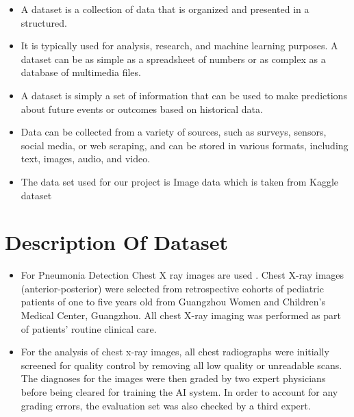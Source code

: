 
%
%
%



{ 
	

  \begin{itemize}
    \item A dataset is a collection of data that is organized and presented in a structured.
    
   \item It is typically used for analysis, research, and machine learning purposes. A dataset can be as simple as a spreadsheet of numbers or as complex as a database of multimedia files.
    
    \item A dataset is simply a set of information that can be used to make predictions about future events or outcomes based on historical data.
    
   \item Data can be collected from a variety of sources, such as surveys, sensors, social media, or web scraping, and can be stored in various formats, including text, images, audio, and video.
    
    \item The data set used for our project is Image data which is taken from Kaggle dataset 
  
  \end{itemize}

}




\section{Description Of Dataset}
{ 
	  \begin{itemize}
	  	
	  	
	   \item	For Pneumonia Detection Chest X ray images are used . Chest X-ray images (anterior-posterior) were selected from retrospective cohorts of pediatric patients of one to five years old from Guangzhou Women and Children’s Medical Center, Guangzhou. All chest X-ray imaging was performed as part of patients’ routine clinical care.
	  
	   \item	For the analysis of chest x-ray images, all chest radiographs were initially screened for quality control by removing all low quality or unreadable scans.
	  	The diagnoses for the images were then graded by two expert physicians before being cleared for training the AI system. In order to account for any grading errors, the evaluation set was also checked by a third expert.\cite{kermany2018identifying}
	  	
	  	
	  	
	  	 \end{itemize}


}

